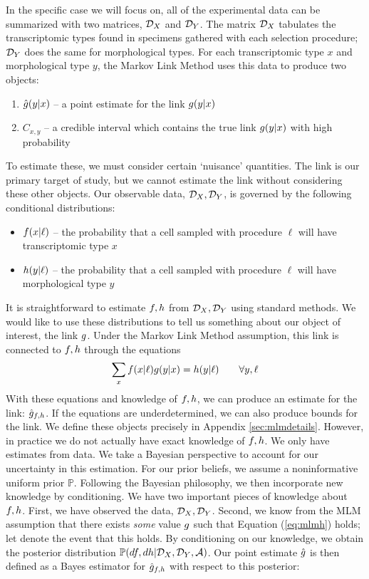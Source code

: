 In the specific case we will focus on, all of the experimental data can be summarized with two matrices, ${\mathcal{D}_X}$ and ${\mathcal{D}_Y}$.  The matrix ${\mathcal{D}_X}$ tabulates the transcriptomic types found in specimens gathered with each selection procedure; ${\mathcal{D}_Y}$ does the same for morphological types.   For each transcriptomic type $x$ and morphological type $y$, the Markov Link Method uses this data to produce two objects:
%
\begin{enumerate}
    \item $\hat {g}(y|x)$ -- a point estimate for the link $g(y|x)$
    \item $C_{x,y}$ -- a credible interval which contains the true link $g(y|x)$ with high probability
\end{enumerate}
%
To estimate these, we must consider certain `nuisance' quantities.  The link is our primary target of study, but we cannot estimate the link without considering these other objects.  Our observable data, ${\mathcal{D}_X},{\mathcal{D}_Y}$, is governed by the following conditional distributions:
\begin{itemize}
    \item $f(x|\ell)$ -- the probability that a cell sampled with procedure $\ell$ will have transcriptomic type $x$
    \item $h(y|\ell)$ -- the probability that a cell sampled with procedure $\ell$ will have morphological type $y$
\end{itemize}
It is straightforward to estimate $f,h$ from ${\mathcal{D}_X},{\mathcal{D}_Y}$ using standard methods.  We would like to use these distributions to tell us something about our object of interest, the link $g$.  Under the Markov Link Method assumption, this link is connected to $f,h$ through the equations
\begin{gather}\label{eq:mlmh}
\sum_x f(x|\ell)g(y|x)=h(y|\ell) \qquad \forall y,\ell
\end{gather}
With these equations and knowledge of $f,h$, we can produce an estimate for the link: $\hat {g}_{f,h}$.  If the equations are underdetermined, we can also produce bounds for the link.  We define these objects precisely in Appendix \ref{sec:mlmdetails}.  However, in practice we do not actually have exact knowledge of $f,h$.  We only have estimates from data.  We take a Bayesian perspective to account for our uncertainty in this estimation.  For our prior beliefs, we assume a noninformative uniform prior $\mathbb{P}$.  Following the Bayesian philosophy, we then incorporate new knowledge by conditioning.  We have two important pieces of knowledge about $f,h$.  First, we have observed the data, ${\mathcal{D}_X},{\mathcal{D}_Y}$.  Second, we know from the MLM assumption that there exists \emph{some} value $g$ such that Equation (\ref{eq:mlmh}) holds; let \MLMH{} denote the event that this holds.  By conditioning on our knowledge, we obtain the posterior distribution $\mathbb{P}(df,dh | {\mathcal{D}_X},{\mathcal{D}_Y},\mathcal{A})$.  Our point estimate $\hat {g}$ is then defined as a Bayes estimator for $\hat {g}_{f,h}$ with respect to this posterior:
